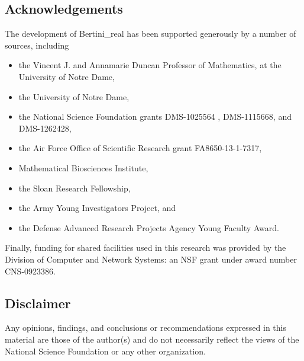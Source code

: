 \subsection{Acknowledgements}

The development of Bertini\_real has been supported generously by a number of sources, including 
\begin{itemize}
\item the Vincent J. and Annamarie Duncan Professor of Mathematics, at the University of Notre Dame, 
\item the University of Notre Dame, 
\item the National Science Foundation grants DMS-1025564 , DMS-1115668, and DMS-1262428, 
\item the Air Force Office of Scientific Research grant FA8650-13-1-7317, 
\item Mathematical Biosciences Institute, 
\item the Sloan Research Fellowship, 
\item the Army Young Investigators Project, and 
\item the Defense Advanced Research Projects Agency Young Faculty Award.
\end{itemize}

Finally, funding for shared facilities used in this research was provided by the Division of Computer and Network Systems: an NSF grant under award number CNS-0923386.




\subsection*{Disclaimer}

Any opinions, findings, and conclusions or recommendations expressed in this material are those of the author(s) and do not necessarily reflect the views of the National Science Foundation or any other organization.
